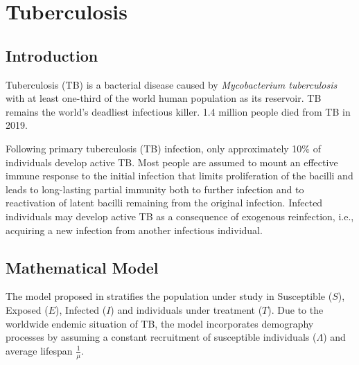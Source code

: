 \documentclass{book}\usepackage[]{graphicx}\usepackage[]{color}
\begin{document}
\section{Tuberculosis}
\subsection*{Introduction}
Tuberculosis (TB) is a bacterial disease caused  by {\it Mycobacterium tuberculosis} with at least one-third of the world human population as its reservoir. %
TB remains the world’s deadliest infectious killer. 1.4 million people died from TB in 2019. %

Following primary tuberculosis (TB)  infection, only  approximately  10\% of  individuals develop active TB. Most people are assumed to mount an effective immune response to the initial infection that limits proliferation of the bacilli and leads to long-lasting partial immunity both to further infection and to reactivation of latent bacilli remaining from the original infection. Infected individuals may develop active TB as a consequence of exogenous reinfection, i.e.,  acquiring  a  new  infection  from  another  infectious  individual.

\subsection*{Mathematical Model}
The model proposed in \cite{feng2000model} stratifies the population under study in Susceptible ($S$), Exposed ($E$), Infected ($I$) and individuals under treatment ($T$).
Due to the worldwide endemic situation of TB, the model incorporates demography processes by assuming a constant recruitment of susceptible individuals ($\Lambda$) and average lifespan $\frac{1}{\mu}$. 
\end{document}
